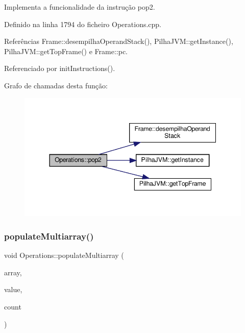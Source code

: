 Implementa a funcionalidade da instrução pop2. 



Definido na linha 1794 do ficheiro Operations.\+cpp.



Referências Frame\+::desempilha\+Operand\+Stack(), Pilha\+J\+V\+M\+::get\+Instance(), Pilha\+J\+V\+M\+::get\+Top\+Frame() e Frame\+::pc.



Referenciado por init\+Instructions().

Grafo de chamadas desta função\+:\nopagebreak
\begin{figure}[H]
\begin{center}
\leavevmode
\includegraphics[width=344pt]{classOperations_a54e578f7f27df39f8c516ec93195e219_cgraph}
\end{center}
\end{figure}
\mbox{\label{classOperations_af5306e6b717783a9752af2bbc922e36b}} 
\subsubsection{\texorpdfstring{populate\+Multiarray()}{populateMultiarray()}}
{\footnotesize\ttfamily void Operations\+::populate\+Multiarray (\begin{DoxyParamCaption}\item[{\hyperlink{classArrayObject}{Array\+Object} $\ast$}]{array,  }\item[{\hyperlink{BasicTypes_8h_ad9971b6ef33e02ba2c75d19c1d2518a1}{Value\+Type}}]{value,  }\item[{stack$<$ int $>$}]{count }\end{DoxyParamCaption})}



